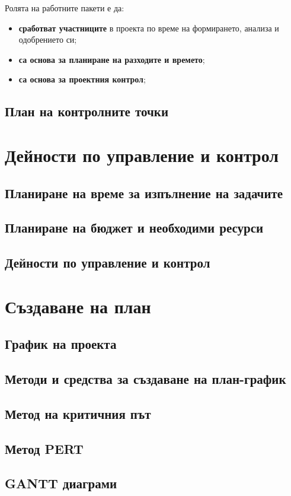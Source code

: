 \documentclass[fleqn,12pt]{article}
\begin{document}
Ролята на работните пакети е да:
\begin{itemize}
    \item \textbf{сработват участниците} в проекта по време на формирането, анализа и одобрението си;
    \item \textbf{са основа за планиране на разходите и времето};
    \item \textbf{са основа за проектния контрол};
\end{itemize}

\subsection{План на контролните точки}

\section{Дейности по управление и контрол}

\subsection{Планиране на време за изпълнение на задачите}
\subsection{Планиране на бюджет и необходими ресурси}
\subsection{Дейности по управление и контрол}

\section{Създаване на план}

\subsection{График на проекта}
\subsection{Методи и средства за създаване на план-график}
\subsection{Метод на критичния път}
\subsection{Метод PERT}
\subsection{GANTT диаграми}
\end{document}
